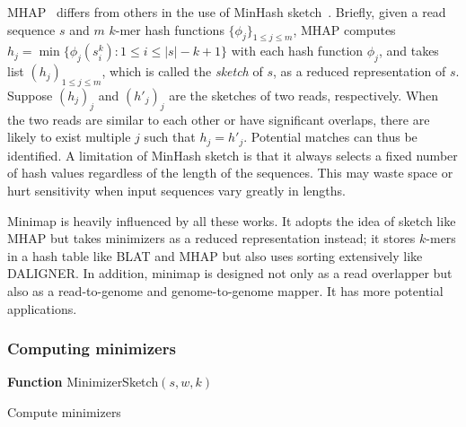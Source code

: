 \documentclass{bioinfo}
\begin{document}
\begin{methods}
MHAP~\citep{Berlin:2015xy} differs from others in the use of MinHash
sketch~\citep{Broder:1997aa}.  Briefly, given a read sequence $s$ and $m$
$k$-mer hash functions $\{\phi_j\}_{1\le j\le m}$, MHAP computes
$h_j=\min\{\phi_j(s_i^k):1\le i\le |s|-k+1\}$ with each hash function $\phi_j$, and
takes list $(h_j)_{1\le j\le m}$, which is called the \emph{sketch} of
$s$, as a reduced representation of $s$. Suppose $(h_j)_j$ and $(h'_j)_j$ are
the sketches of two reads, respectively. When the two reads are similar to each
other or have significant overlaps, there are likely to exist multiple $j$ such
that $h_j=h'_j$. Potential matches can thus be identified. A limitation of
MinHash sketch is that it always selects a fixed number of hash values
regardless of the length of the sequences. This may waste space or hurt
sensitivity when input sequences vary greatly in lengths.

Minimap is heavily influenced by all these works. It adopts the idea of sketch
like MHAP but takes minimizers \citep{Roberts:2004fv} as a reduced
representation instead; it stores $k$-mers in a hash table like BLAT and MHAP
but also uses sorting extensively like DALIGNER. In addition, minimap is
designed not only as a read overlapper but also as a read-to-genome and
genome-to-genome mapper. It has more potential applications.

\subsubsection{Computing minimizers}

\begin{algorithm}[tb]
\DontPrintSemicolon
\footnotesize
{}
\BlankLine
\textbf{Function} {\sc MinimizerSketch}$(s,w,k)$
\caption{Compute minimizers}\label{alg:minimizer}
\end{algorithm}


\end{methods}
\end{document}
